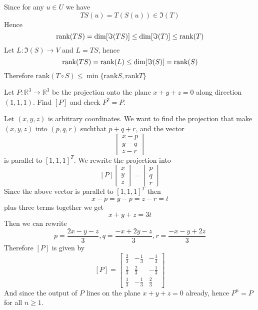 \documentclass[11pt]{article}
\begin{document}
\begin{sol}
    Since for any $u \in U$ we have 
    \[
        TS(u) = T(S(u)) \in \Im(T)
    \]
    Hence 
    \[
    \mathrm{rank}(TS) = \dim[\Im(TS)] \leq \dim[\Im(T)] \le \mathrm{rank}(T)
    \]
    Let $L: \Im(S) \to V$ and $L = TS$, hence 
    \[
        \mathrm{rank}(TS) = \mathrm{rank}(L) \leq  \dim[\Im(S)]= \mathrm{rank}(S)
    \]
    Therefore $\mathrm{rank}(T\circ S)\le \min\{\mathrm{rank} S,\mathrm{rank} T\}$
\end{sol}
\begin{problem}
Let $P:\mathbb{R}^3\to\mathbb{R}^3$ be the projection onto the plane $x+y+z=0$ along direction $(1,1,1)$. 
Find $[P]$ and check $P^2=P$.
\end{problem}
\begin{sol}
    Let $(x,y,z)$ is arbitrary coordinates. We want to find the projection that make $(x,y,z)$ into $(p,q,r)$ suchthat $p + q + r$, and the vector 
    \[
        \begin{bmatrix}
            x - p\\
            y - q\\
            z - r
        \end{bmatrix}
    \]
    is parallel to $[1,1,1]^T$. We rewrite the projection into 
    \[
        [P]\begin{bmatrix}
            x\\y\\z
        \end{bmatrix}= \begin{bmatrix}
            p\\q\\r
        \end{bmatrix}
    \]
    Since the above vector is parallel to $[1,1,1]^T$ then 
    \[
        x - p = y - p = z - r = t
    \]
    plus three terms together we get 
    \[
        x + y + z = 3t
    \]
    Then we can rewrite 
    \[
        p = \frac{2x - y - z}{3}, q = \frac{-x + 2y - z}{3}, r = \frac{-x-y+2z}{3}
    \]
    Therefore $[P]$ is given by
    \[
        [P] = \begin{bmatrix}
            \frac{2}{3} & -\frac{1}{3} & -\frac{1}{3}\\
            \frac{1}{3} & \frac{2}{3} & -\frac{1}{3}\\
            \frac{1}{3} & -\frac{1}{3} & \frac{2}{3}
        \end{bmatrix}
    \]
    And since the output of $P$ lines on the plane $x + y + z = 0$ already, hence $P^n = P$ for all $n \geq 1$.
\end{sol}
\end{document}
